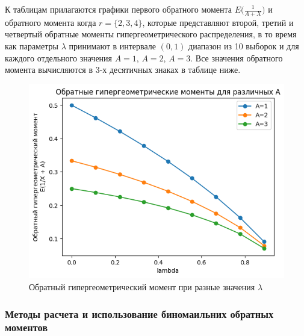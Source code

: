 \documentclass[13pt]{article}
\begin{document}
К таблицам прилагаются графики первого обратного момента $E\big(\frac{1}{A+X}\big)$ и обратного момента когда $r = \{2, 3, 4\}$, которые представляют второй, третий и четвертый обратные моменты гипергеометрического распределения, в то время как параметры $\lambda$ принимают в интервале $(0, 1)$ диапазон из 10 выборок и для каждого отдельного значения $A=1$, $A=2$, $A=3$. Все значения обратного момента вычисляются в 3-х десятичных знаках в таблице ниже.
\vspace{6 mm}
\begin{figure}[htp]
    \centering
    \includegraphics[width=12cm]{images/output1.png}
    \caption{ Обратный гипергеометрический момент при разные значения $\lambda$ }
    \label{hypergeo_fig}
\end{figure}



\newpage
\subsubsection{Методы расчета и использование биномаильних обратных моментов}
\end{document}
